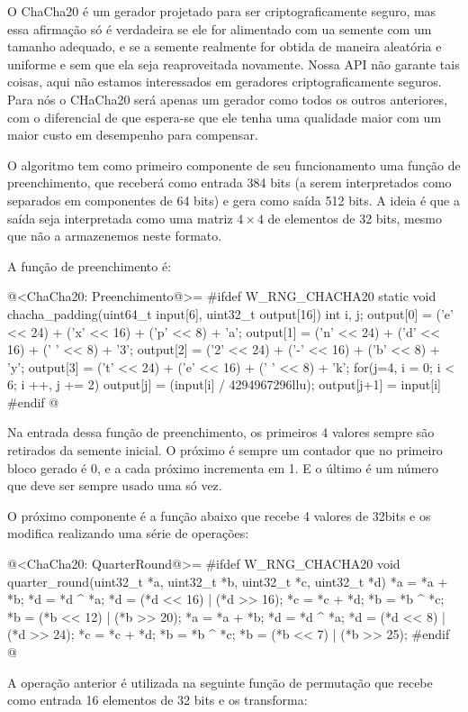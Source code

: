 O ChaCha20 é um gerador projetado para ser criptograficamente seguro,
mas essa afirmação só é verdadeira se ele for alimentado com ua
semente com um tamanho adequado, e se a semente realmente for obtida
de maneira aleatória e uniforme e sem que ela seja reaproveitada
novamente. Nossa API não garante tais coisas, aqui não estamos
interessados em geradores criptograficamente seguros. Para nós o
CHaCha20 será apenas um gerador como todos os outros anteriores, com o
diferencial de que espera-se que ele tenha uma qualidade maior com um
maior custo em desempenho para compensar.

O algoritmo tem como primeiro componente de seu funcionamento uma
função de preenchimento, que receberá como entrada 384 bits (a serem
interpretados como separados em componentes de 64 bits) e gera como
saída 512 bits. A ideia é que a saída seja interpretada como uma
matriz $4\times 4$ de elementos de 32 bits, mesmo que não a
armazenemos neste formato.

A função de preenchimento é:

@<ChaCha20: Preenchimento@>=
#ifdef W_RNG_CHACHA20
static void chacha_padding(uint64_t input[6], uint32_t output[16]){
  int i, j;
  output[0] = ('e' << 24) + ('x' << 16) + ('p' << 8) + 'a';
  output[1] = ('n' << 24) + ('d' << 16) + (' ' << 8) + '3';
  output[2] = ('2' << 24) + ('-' << 16) + ('b' << 8) + 'y';
  output[3] = ('t' << 24) + ('e' << 16) + (' ' << 8) + 'k';
  for(j=4, i = 0; i < 6; i ++, j += 2){
    output[j] = (input[i] / 4294967296llu);
    output[j+1] = input[i] %
  }
}
#endif
@

Na entrada dessa função de preenchimento, os primeiros 4 valores
sempre são retirados da semente inicial. O próximo é sempre um
contador que no primeiro bloco gerado é 0, e a cada próximo incrementa
em 1. E o último é um número que deve ser sempre usado uma só vez.

O próximo componente é a função abaixo que recebe 4 valores de 32bits
e os modifica realizando uma série de operações:

@<ChaCha20: QuarterRound@>=
#ifdef W_RNG_CHACHA20
void quarter_round(uint32_t *a, uint32_t *b, uint32_t *c, uint32_t *d){
  *a = *a + *b;
  *d = *d ^ *a;
  *d = (*d << 16) | (*d >> 16);
  *c = *c + *d;
  *b = *b ^ *c;
  *b = (*b << 12) | (*b >> 20);
  *a = *a + *b;
  *d = *d ^ *a;
  *d = (*d << 8) | (*d >> 24);
  *c = *c + *d;
  *b = *b ^ *c;
  *b = (*b << 7) | (*b >> 25);
}
#endif
@

A operação anterior é utilizada na seguinte função de permutação que
recebe como entrada 16 elementos de 32 bits e os transforma:


